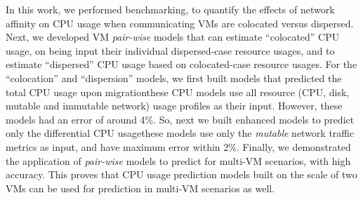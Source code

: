 In this work, we performed benchmarking, to
quantify the effects of network affinity on CPU usage when communicating VMs
are colocated versus dispersed.
Next, we developed VM \textit{pair-wise} models
that can estimate ``colocated'' CPU usage, on being
input their individual dispersed-case resource usages,
and to estimate ``dispersed'' CPU
usage based on colocated-case resource usages.
For the ``colocation'' and ``dispersion'' models, we first
built models that predicted the total CPU usage
upon migration\textemdash{}these CPU models use all resource (CPU, disk, mutable
and immutable network) usage profiles as their input. However, these models
had an error of around 4\%. So, next we built enhanced models
to predict only the differential CPU usage\textemdash{}these
models use only the \textit{mutable} network traffic metrics as input,
and have maximum error within 2\%. Finally, we demonstrated the
application of \textit{pair-wise} models to predict for multi-VM
scenarios, with high accuracy.
This proves that CPU usage prediction models built
on the scale of two VMs can be used for prediction in multi-VM
scenarios as well.


%
%

